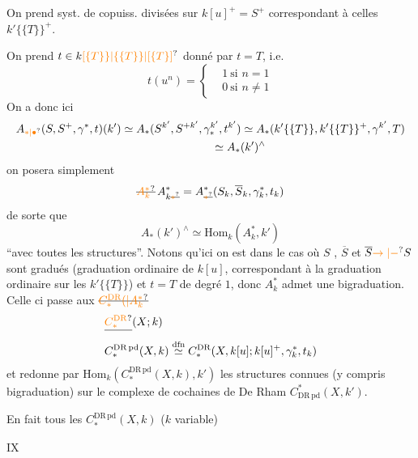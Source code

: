 On prend syst. de copuiss. divisées sur $k[u]^+=S^+$ correspondant à celles   $k'\{\{T\}\}^+$.

On prend $t\in k\unsure{[\{T\}\}|\{\{T\}\}|[\{T\}]}$ donné par $t=T$, i.e.
\[
 t(u^n)=\left\{\begin{aligned} &1\ \text{si }n=1\\ &0\ \text{si }n\neq1\end{aligned}\right.
\]
On a donc ici
\[
\begin{aligned}
 A_{\unsure{*|\bullet}}(S,S^+,\gamma^*,t)(k')&\simeq A_*(S^{k'},S^{+k'},\gamma_*^{k'},t^{k'})
 \simeq A_*(k'\{\{T\}\},k'\{\{T\}\}^+,\gamma^{k'},T)\\
 &\hspace{8em}\simeq A_*(k')^\wedge
\end{aligned}
\]
on posera simplement
\[
 \deleted{\unsure{A_k^*}}\, A_{k\deleted{\unsure{*}}}^*
 = A_{\deleted{\unsure{*}}}^*(S_k,\overline S_k,\gamma_k^*,t_k)
\]
de sorte que
\[
 A_*(k')^\wedge\simeq\mathrm{Hom}_k(A_k^*,k')
\]
``avec toutes les structures''. Notons qu'ici on est dans le cas où $S$ , $\overline S$ et $\overline S\unsure{\to|-}S$ sont gradués (graduation ordinaire de $k[u]$, correspondant à la graduation ordinaire sur les $k'\{\{T\}\}$) et $t=T$ de  degré $1$, donc   $A_k^*$ admet une bigraduation. Celle ci passe aux $\deleted{\unsure{C_*^{\mathrm{DR}}(|A_k^*}}$
\[
\begin{aligned}
 &\deleted{\unsure{C_*^{\mathrm{DR}}}}(X;k)\\
 &C_*^{\mathrm{DR\,pd}}(X,k)\mathrel{\overset{\mathrm{dfn}}{\simeq}}
 C_*^{\mathrm{DR}}(X,k[u];k[u]^+,\gamma_k^*,t_k)
\end{aligned}
\]
et redonne  par $\mathrm{Hom}_k(C_*^{\mathrm{DR\,pd}}(X,k),k')$ les structures connues (y compris bigraduation) sur le complexe de cochaines de De Rham $C_{\mathrm{DR\,pd}}^*(X,k')$.

En fait tous les $C_*^{\mathrm{DR\,pd}}(X,k)$ ($k$ variable)

\hfill IX

